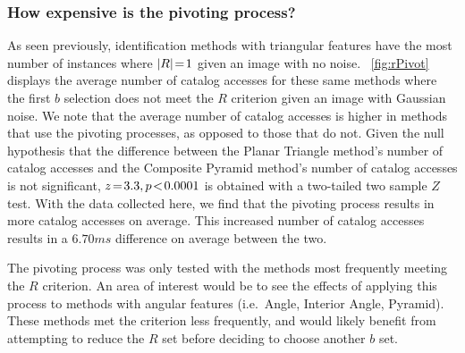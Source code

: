 \documentclass[conference]{IEEEtran}
\begin{document}
    \subsubsection{How expensive is the pivoting process?}
    As seen previously, identification methods with triangular features have the most number of instances where
    $\left| R \right| \!=\! 1$ given an image with no noise.
    ~\autoref{fig:rPivot} displays the average number of catalog accesses for these same methods where the first
    $b$ selection does not meet the $R$ criterion given an image with Gaussian noise.
    We note that the average number of catalog accesses is higher in methods that use the pivoting processes,
    as opposed to those that do not.
    Given the null hypothesis that the difference between the Planar Triangle method's number of catalog accesses and
    the Composite Pyramid method's number of catalog accesses is not significant, $z \!=\! 3.3, p\!<\!0.0001$ is
    obtained with a two-tailed two sample $Z$ test.
    With the data collected here, we find that the pivoting process results in more catalog accesses on average.
    This increased number of catalog accesses results in a $6.70\si{ms}$ difference on average between the two.

    The pivoting process was only tested with the methods most frequently meeting the $R$ criterion.
    An area of interest would be to see the effects of applying this process to methods with angular features (i.e.\ Angle,
    Interior Angle, Pyramid).
    These methods met the criterion less frequently, and would likely benefit from attempting to reduce the $R$ set before
    deciding to choose another $b$ set.
\end{document}
